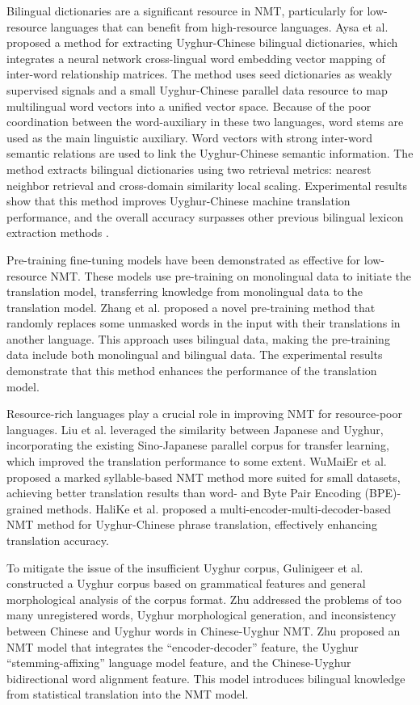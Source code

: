 \documentclass[acmsmall]{acmart}
\begin{document}
Bilingual dictionaries are a significant resource in NMT, particularly for low-resource languages that can benefit from high-resource languages. Aysa et al. proposed a method for extracting Uyghur-Chinese bilingual dictionaries, which integrates a neural network cross-lingual word embedding vector mapping of inter-word relationship matrices. The method uses seed dictionaries as weakly supervised signals and a small Uyghur-Chinese parallel data resource to map multilingual word vectors into a unified vector space. Because of the poor coordination between the word-auxiliary in these two languages, word stems are used as the main linguistic auxiliary. Word vectors with strong inter-word semantic relations are used to link the Uyghur-Chinese semantic information. The method extracts bilingual dictionaries using two retrieval metrics: nearest neighbor retrieval and cross-domain similarity local scaling. Experimental results show that this method improves Uyghur-Chinese machine translation performance, and the overall accuracy surpasses other previous bilingual lexicon extraction methods \cite{4-8}.

Pre-training fine-tuning models have been demonstrated as effective for low-resource NMT. These models use pre-training on monolingual data to initiate the translation model, transferring knowledge from monolingual data to the translation model. Zhang et al. proposed a novel pre-training method that randomly replaces some unmasked words in the input with their translations in another language. This approach uses bilingual data, making the pre-training data include both monolingual and bilingual data. The experimental results demonstrate that this method enhances the performance of the translation model\cite{4-8b1}.

Resource-rich languages play a crucial role in improving NMT for resource-poor languages. Liu et al. \cite{4-8b3} leveraged the similarity between Japanese and Uyghur, incorporating the existing Sino-Japanese parallel corpus for transfer learning, which improved the translation performance to some extent. WuMaiEr et al. proposed a marked syllable-based NMT method more suited for small datasets, achieving better translation results than word- and Byte Pair Encoding (BPE)-grained methods\cite{4-9}. HaliKe et al. proposed a multi-encoder-multi-decoder-based NMT method for Uyghur-Chinese phrase translation, effectively enhancing translation accuracy\cite{4-10}.

To mitigate the issue of the insufficient Uyghur corpus, Gulinigeer et al. constructed a Uyghur corpus based on grammatical features and general morphological analysis of the corpus format\cite{4add-one}. Zhu addressed the problems of too many unregistered words, Uyghur morphological generation, and inconsistency between Chinese and Uyghur words in Chinese-Uyghur NMT. Zhu proposed an NMT model that integrates the ``encoder-decoder'' feature, the Uyghur ``stemming-affixing'' language model feature, and the Chinese-Uyghur bidirectional word alignment feature. This model introduces bilingual knowledge from statistical translation into the NMT model\cite{4-11}. 
\end{document}
